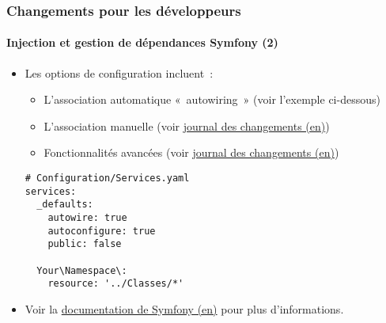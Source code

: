 \begin{frame}[fragile]
	\frametitle{Changements pour les développeurs}
	\framesubtitle{Injection et gestion de dépendances Symfony (2)}

	\lstset{basicstyle=\tiny\ttfamily}

	\begin{itemize}
		\item Les options de configuration incluent~:

			\begin{itemize}
				\item L'association automatique «~autowiring~» (voir l'exemple ci-dessous)
				\item L'association manuelle
					(voir \href{https://docs.typo3.org/c/typo3/cms-core/master/en-us/Changelog/10.0/Feature-84112-SymfonyDependencyInjectionForCoreAndExtbase.html}{journal des changements (en)})
				\item Fonctionnalités avancées
					(voir \href{https://docs.typo3.org/c/typo3/cms-core/master/en-us/Changelog/10.0/Feature-84112-SymfonyDependencyInjectionForCoreAndExtbase.html}{journal des changements (en)})
			\end{itemize}


\begin{lstlisting}
# Configuration/Services.yaml
services:
  _defaults:
    autowire: true
    autoconfigure: true
    public: false

  Your\Namespace\:
    resource: '../Classes/*'
\end{lstlisting}

		\item Voir la \href{https://symfony.com/doc/current/service_container.html}{documentation de Symfony (en)} pour plus d'informations.

	\end{itemize}

\end{frame}


